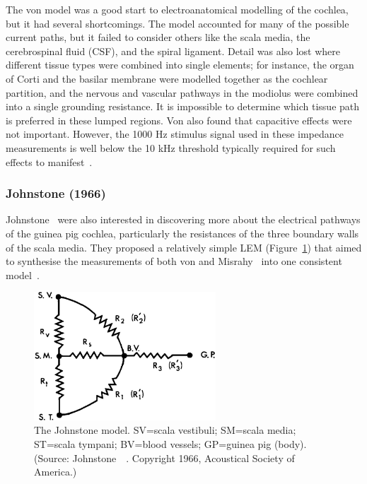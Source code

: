 The von \bekesy{} model was a good start to electroanatomical modelling of the
cochlea, but it had several shortcomings. The model accounted for many of the
possible current paths, but it failed to consider others like the scala media,
the cerebrospinal fluid (CSF), and the spiral ligament. Detail was also lost
where different tissue types were combined into single elements; for instance,
the organ of Corti and the basilar membrane were modelled together as the
cochlear partition, and the nervous and vascular pathways in the modiolus were
combined into a single grounding resistance. It is impossible to determine which
tissue path is preferred in these lumped regions. Von \bekesy{} also found that
capacitive effects were not important. However, the 1000 Hz stimulus signal used
in these impedance measurements is well below the 10 kHz threshold typically
required for such effects to manifest~\cite{geddes1967}.

\subsubsection{Johnstone \etal{} (1966)}

Johnstone~\etal{} were also interested in discovering more about the electrical
pathways of the guinea pig cochlea, particularly the resistances of the three
boundary walls of the scala media. They proposed a relatively simple LEM
(Figure~\ref{fig:model_johnstone}) that aimed to synthesise the measurements of
both von \bekesy{} and Misrahy~\cite{misrahy1958} into one consistent
model~\cite{johnstone1966}.

\begin{figure}
	\centering
	\includegraphics[height=4.8cm]{Background/johnstone}
	\caption[The Johnstone model]{The Johnstone model. SV=scala vestibuli; SM=scala
	media; ST=scala tympani; BV=blood vessels; GP=guinea pig (body). (Source:
	Johnstone~\etal~\cite{johnstone1966}. Copyright \textcopyright{} 1966,
	Acoustical Society of America.)}
	\label{fig:model_johnstone}
\end{figure}

